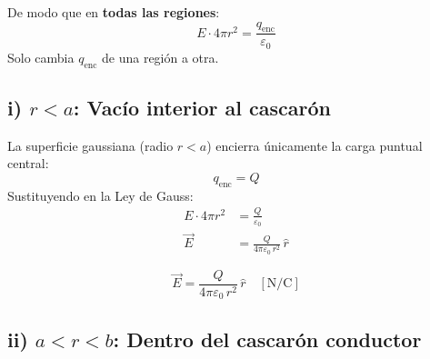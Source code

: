 \documentclass[12pt,letterpaper]{article}
\begin{document}
De modo que en \textbf{todas las regiones}:
\[
    E \cdot 4\pi r^2 = \frac{q_\text{enc}}{\varepsilon_0}
\]
Solo cambia $q_\text{enc}$ de una regi\'on a otra.

\bigskip

\subsection*{i) $r < a$: Vac\'io interior al cascar\'on}

\noindent
\begin{minipage}[c]{0.30\textwidth}
\centering
{}
\end{minipage}%
\hfill
\begin{minipage}[c]{0.67\textwidth}
La superficie gaussiana (radio $r < a$) encierra \'unicamente la carga
puntual central:
\[
    q_\text{enc} = Q
\]
Sustituyendo en la Ley de Gauss:
\begin{align*}
    E \cdot 4\pi r^2 &= \frac{Q}{\varepsilon_0} \\[6pt]
    \vec{E}          &= \frac{Q}{4\pi\varepsilon_0\,r^2}\,\hat{r}
\end{align*}
\end{minipage}

\[
    \boxed{\vec{E} = \frac{Q}{4\pi\varepsilon_0\,r^2}\,\hat{r} \quad [\text{N/C}]}
\]

\bigskip

\subsection*{ii) $a < r < b$: Dentro del cascar\'on conductor}
\end{document}
